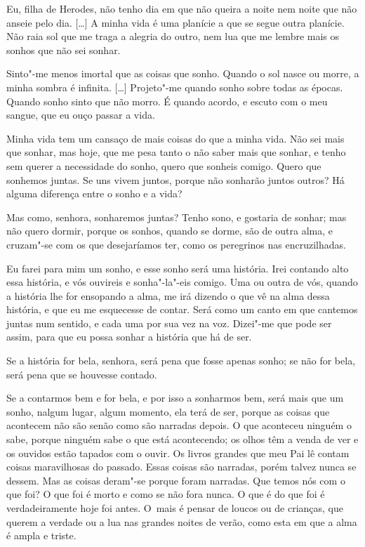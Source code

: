 Eu, filha de Herodes, não tenho dia em que não queira a noite nem noite
que não anseie pelo dia. [\ldots{}] A minha vida é uma planície a que se
segue outra planície. Não raia sol que me traga a alegria do outro,
nem lua que me lembre mais os sonhos que não sei sonhar.

 Sinto"-me menos imortal que as coisas que sonho. Quando o
sol nasce ou morre, a minha sombra é infinita. [\ldots{}] Projeto"-me
quando sonho sobre todas as épocas. Quando sonho sinto que não morro.
É quando acordo, e escuto com o meu sangue, que eu ouço passar a
vida.

 Minha vida tem um cansaço de mais coisas do que a minha
vida. Não sei mais que sonhar, mas hoje, que me pesa tanto o não
saber mais que sonhar, e tenho sem querer a necessidade do sonho,
quero que sonheis comigo. Quero que sonhemos juntas. Se uns vivem
juntos, porque não sonharão juntos outros? Há alguma diferença entre
o sonho e a vida?

 Mas como, senhora, sonharemos juntas? Tenho sono, e gostaria de
sonhar; mas não quero dormir, porque os sonhos, quando se dorme, são
de outra alma, e cruzam"-se com os que desejaríamos ter, como os
peregrinos nas encruzilhadas.

 Eu farei para mim um sonho, e esse sonho será uma história.
Irei contando alto essa história, e vós ouvireis e sonha"-la"-eis
comigo. Uma ou outra de vós, quando a história lhe for ensopando a
alma, me irá dizendo o que vê na alma dessa história, e que eu me
esquecesse de contar. Será como um canto em que cantemos juntas num
sentido, e cada uma por sua vez na voz. Dizei"-me que pode ser assim,
para que eu possa sonhar a história que há de ser.

 Se a história for bela, senhora, será pena que fosse apenas
sonho; se não for bela, será pena que se houvesse contado.

 Se a contarmos bem e for bela, e por isso a sonharmos bem,
será mais que um sonho, nalgum lugar, algum momento, ela terá de ser,
porque as coisas que acontecem não são senão como são narradas
depois. O que aconteceu ninguém o sabe, porque ninguém sabe o que
está acontecendo; os olhos têm a venda de ver e os ouvidos estão
tapados com o ouvir. Os livros grandes que meu Pai lê contam coisas
maravilhosas do passado. Essas coisas são narradas, porém talvez
nunca se dessem. Mas as coisas deram"-se porque foram narradas. Que
temos nós com o que foi? O que foi é morto e como se não fora nunca.
O que é do que foi é verdadeiramente hoje foi antes. O~mais é pensar
de loucos ou de crianças, que querem a verdade ou a lua nas grandes
noites de verão, como esta em que a alma é ampla e triste.

